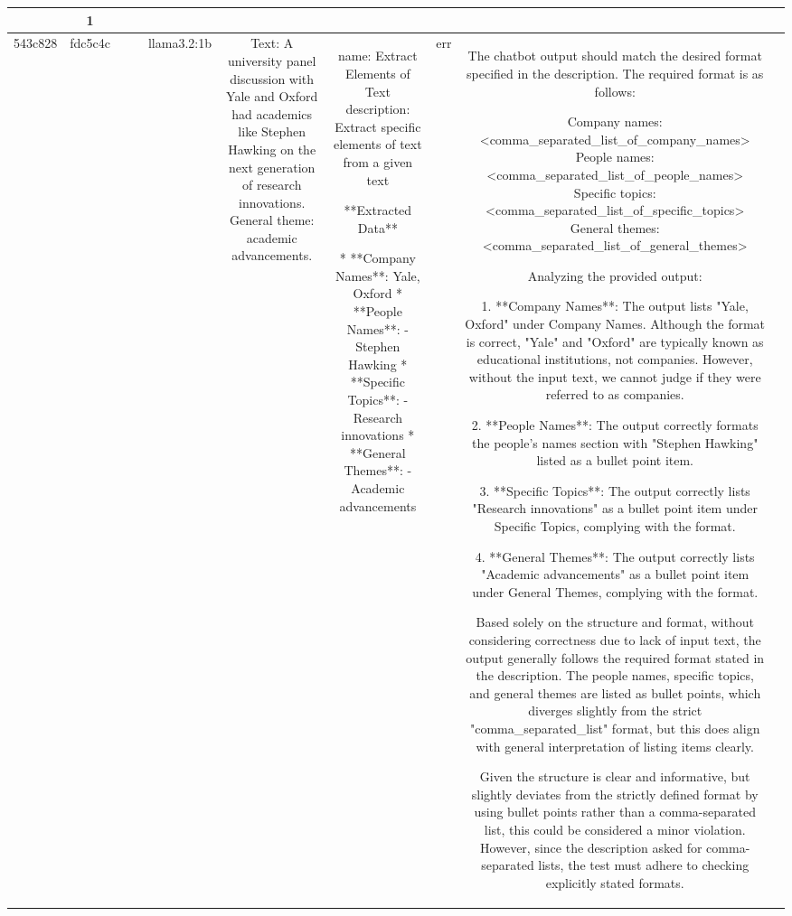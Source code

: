 \begin{table}[h!]
\begin{tabular}{|c|c|c|c|c|c|c|c|c|c|}
{OK & 1\\
\hline
543c828 & fdc5c4c &  &  & llama3.2:1b & Text: A university panel discussion with Yale and Oxford had academics like Stephen Hawking on the next generation of research innovations. General theme: academic advancements. & name: Extract Elements of Text
description: Extract specific elements of text from a given text

**Extracted Data**

* **Company Names**: Yale, Oxford
* **People Names**: 
  - Stephen Hawking
* **Specific Topics**: 
  - Research innovations
* **General Themes**: 
  - Academic advancements & err & The chatbot output should match the desired format specified in the description. The required format is as follows:

Company names: <comma_separated_list_of_company_names>  
People names: <comma_separated_list_of_people_names>  
Specific topics: <comma_separated_list_of_specific_topics>  
General themes: <comma_separated_list_of_general_themes>  

Analyzing the provided output:

1. **Company Names**: The output lists "Yale, Oxford" under Company Names. Although the format is correct, "Yale" and "Oxford" are typically known as educational institutions, not companies. However, without the input text, we cannot judge if they were referred to as companies.

2. **People Names**: The output correctly formats the people's names section with "Stephen Hawking" listed as a bullet point item.

3. **Specific Topics**: The output correctly lists "Research innovations" as a bullet point item under Specific Topics, complying with the format.

4. **General Themes**: The output correctly lists "Academic advancements" as a bullet point item under General Themes, complying with the format.

Based solely on the structure and format, without considering correctness due to lack of input text, the output generally follows the required format stated in the description. The people names, specific topics, and general themes are listed as bullet points, which diverges slightly from the strict "comma_separated_list" format, but this does align with general interpretation of listing items clearly. 

Given the structure is clear and informative, but slightly deviates from the strictly defined format by using bullet points rather than a comma-separated list, this could be considered a minor violation. However, since the description asked for comma-separated lists, the test must adhere to checking explicitly stated formats.

}
\end{tabular}
\end{table}
